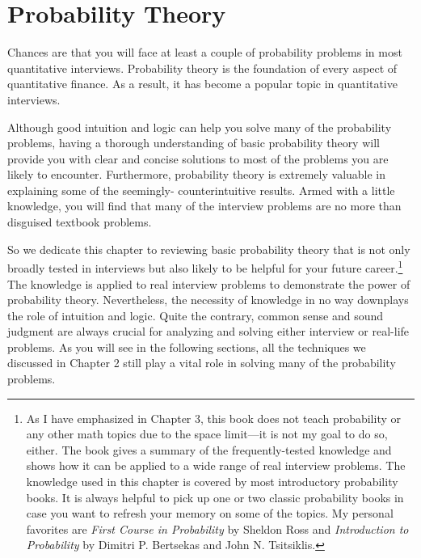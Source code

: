 
\section{Probability Theory}

Chances are that you will face at least a couple of probability problems in most
quantitative interviews. Probability theory is the foundation of every aspect of
quantitative finance. As a result, it has become a popular topic in quantitative interviews.

Although good intuition and logic can help you solve many of the probability problems,
having a thorough understanding of basic probability theory will provide you with clear
and concise solutions to most of the problems you are likely to encounter. Furthermore,
probability theory is extremely valuable in explaining some of the seemingly-
counterintuitive results. Armed with a little knowledge, you will find that many of the
interview problems are no more than disguised textbook problems.

So we dedicate this chapter to reviewing basic probability theory that is not only broadly
tested in interviews but also likely to be helpful for your future career.\footnote[1]{As I have
emphasized in Chapter 3, this book does not teach probability or any other math topics due
to the space limit---it is not my goal to do so, either. The book gives a summary of the
frequently-tested knowledge and shows how it can be applied to a wide range of real
interview problems. The knowledge used in this chapter is covered by most introductory
probability books. It is always helpful to pick up one or two classic probability books in
case you want to refresh your memory on some of the topics. My personal favorites are
\textit{First Course in Probability} by Sheldon Ross and \textit{Introduction to Probability}
by Dimitri P. Bertsekas and John N. Tsitsiklis.} The knowledge is applied to real interview
problems to demonstrate the power of probability theory. Nevertheless, the necessity of
knowledge in no way downplays the role of intuition and logic. Quite the contrary, common
sense and sound judgment are always crucial for analyzing and solving either interview or
real-life problems. As you will see in the following sections, all the techniques we
discussed in Chapter 2 still play a vital role in solving many of the probability problems.

